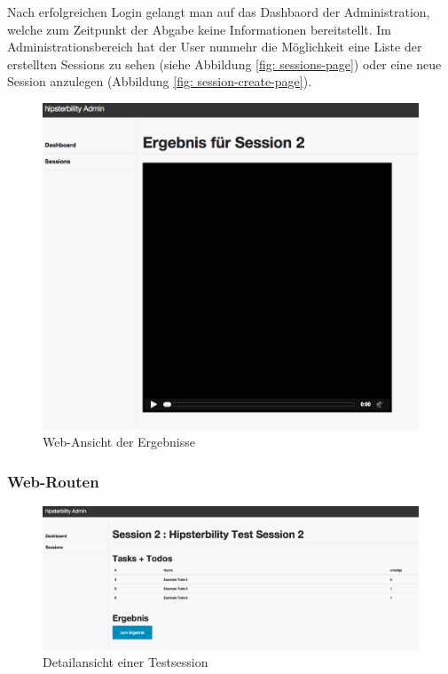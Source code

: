 Nach erfolgreichen Login gelangt man auf das Dashbaord der Administration, welche zum Zeitpunkt der Abgabe keine Informationen bereitstellt. Im Administrationsbereich hat der User nunmehr die Möglichkeit eine Liste der erstellten Sessions zu sehen (siehe Abbildung \ref{fig: sessions-page}) oder eine neue Session anzulegen (Abbildung \ref{fig: session-create-page}). 

\begin{figure}[h!]
	\centering
		\includegraphics[width=\linewidth,keepaspectratio]{img/session-result-page.png}
	\caption{Web-Ansicht der Ergebnisse}
	\label{fig: session-result-page}
\end{figure}

\subsubsection{Web-Routen}

\begin{figure}[h!]
	\centering
		\includegraphics[width=\linewidth,keepaspectratio]{img/session-detail-page.png}
	\caption{Detailansicht einer Testsession}
	\label{fig: session-detail-page}
\end{figure}

